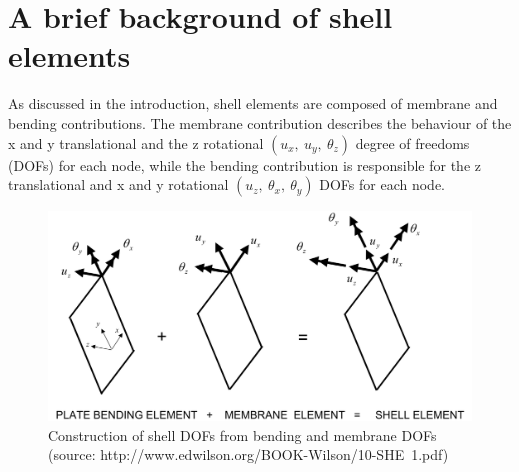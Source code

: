




\setcounter{MaxMatrixCols}{20}


\chapter{A brief background of shell elements}

As discussed in the introduction, shell elements are composed of membrane and bending contributions. The membrane contribution describes the behaviour of the x and y translational and the z rotational $(u_{x},\ u_{y},\ \theta_{z})$ degree of freedoms (DOFs) for each node, while the bending contribution is responsible for the z translational and x and y rotational $(u_{z},\ \theta_{x},\ \theta_{y})$ DOFs for each node.

\begin{figure}[H]
	\centering
	\def\svgwidth{\columnwidth}
	\includegraphics[width=12cm]{images/bendplusmemequalshell.png}
	\caption{Construction of shell DOFs from bending and membrane DOFs \\ (source: http://www.edwilson.org/BOOK-Wilson/10-SHE~1.pdf)}
	\label{bendplusmemequalshell}
\end{figure}

